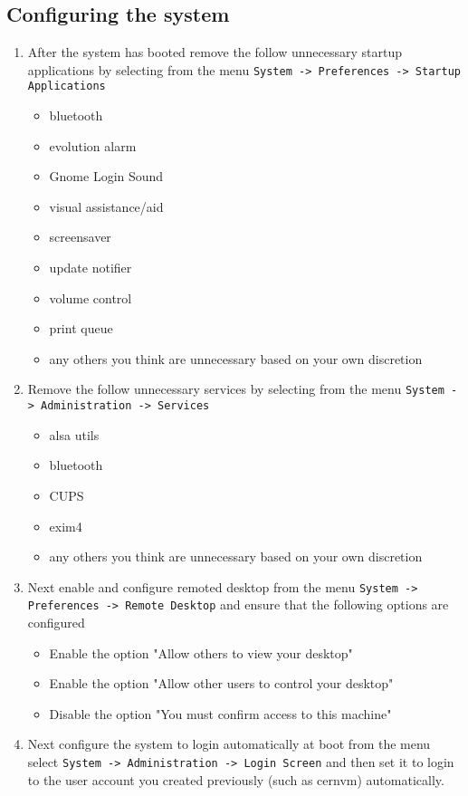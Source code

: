 \subsection{Configuring the system}
\begin{enumerate}
\item After the system has booted remove the follow unnecessary startup applications by selecting from the menu  
\verb|System -> Preferences -> Startup Applications|
\begin{itemize}
\item	bluetooth
\item	evolution alarm
\item	Gnome Login Sound
\item	visual assistance/aid
\item	screensaver
\item	update notifier
\item	volume control
\item	print queue
\item	any others you think are unnecessary based on your own discretion
\end{itemize}

\item Remove the follow unnecessary services by selecting from the menu \verb|System -> Administration -> Services|
\begin{itemize}
\item	alsa utils
\item	bluetooth
\item	CUPS
\item	exim4
\item	any others you think are unnecessary based on your own discretion
\end{itemize}

\item Next enable and configure remoted desktop from the menu \verb|System -> Preferences -> Remote Desktop| and ensure
that the following options are configured
\begin{itemize}
\item	Enable the option "Allow others to view your desktop"
\item	Enable the option "Allow other users to control your desktop"
\item	Disable the option "You must confirm access to this machine"
\end{itemize}

\item Next configure the system to login automatically at boot from the menu select \verb|System -> Administration -> Login Screen|
and then set it to login to the user account you created previously (such as cernvm) automatically.


\end{enumerate}
